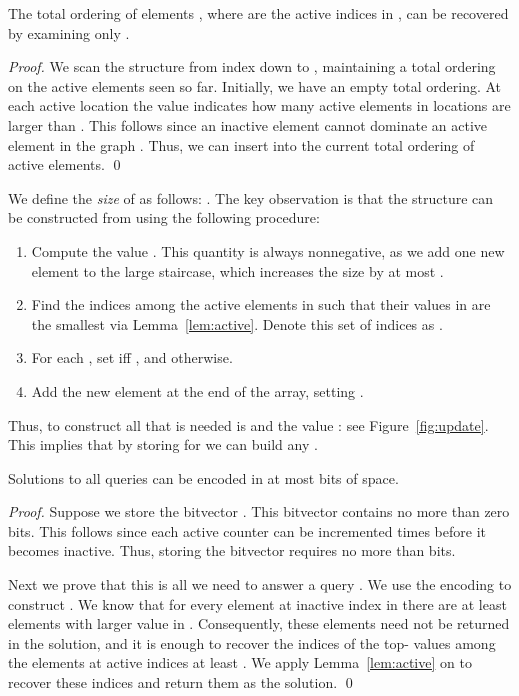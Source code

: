 \documentclass[runningheads]{llncs}
\begin{document}
\begin{lemma}
\label{lem:active}
The total ordering of elements ,
where  are the active indices in
, can be recovered by examining only .
\end{lemma}

\begin{proof}
We scan the structure  from index  down to , maintaining
a total ordering on the active elements seen so far.  Initially, we
have an empty total ordering.  At each active location  the
value  indicates how many active elements in locations
 are larger than .  This follows since an
inactive element cannot dominate an active element in the graph
. Thus, we can insert  into the current total ordering
of active elements. \qed
\end{proof}

We define the \emph{size} of  as follows: .  The key observation is that
the structure  can be constructed from  using the
following procedure:

\begin{enumerate}
\item Compute the value . This
  quantity is always nonnegative, as we add one new element to the
  large staircase, which increases the size by at most .

\item Find the  indices among the active elements in
   such that their values in  are the smallest via
  Lemma~\ref{lem:active}.  Denote this set of indices as
  .

\item For each , set 
  iff , and 
  otherwise.

\item Add the new element at the end of the array, setting
  .
\end{enumerate}

Thus, to construct  all that is needed is  and the
value : see Figure~\ref{fig:update}.  This implies that by
storing  for  we can build any .

\begin{theorem}
\label{thm:top-k-ub}
Solutions to all queries  can be encoded in at most
 bits of space.
\end{theorem}

\begin{proof}
Suppose we store the bitvector .  This bitvector contains no more than  zero
bits.  This follows since each active counter can be incremented 
times before it becomes inactive.  Thus, storing the bitvector
requires no more than  bits.

Next we prove that this is all we need to answer a query .  We
use the encoding to construct . We know that
for every element at inactive index  in  there are at
least  elements with larger value in . Consequently,
these elements need not be returned in the solution, and
it is enough to recover the indices of the top- values among the elements
at active indices at least . We apply  Lemma~\ref{lem:active} on  to
recover these indices and return them as the solution.
\qed
\end{proof}
\end{document}
